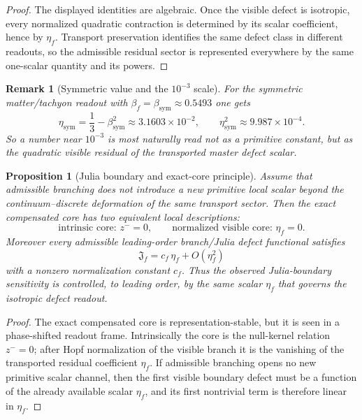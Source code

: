 \documentclass[12pt,a4paper]{article}
\newtheorem{proposition}[theorem]{Proposition}
\newtheorem{remark}[theorem]{Remark}
\newcommand{\zminus}{z^-}
\begin{document}
\begin{proof}
The displayed identities are algebraic. Once the visible defect is isotropic, every normalized quadratic contraction is determined by its scalar coefficient, hence by $\eta_f$. Transport preservation identifies the same defect class in different readouts, so the admissible residual sector is represented everywhere by the same one-scalar quantity and its powers.
\end{proof}

\begin{remark}[Symmetric value and the $10^{-3}$ scale]
For the symmetric matter/tachyon readout with $\beta_f=\beta_{\mathrm{sym}}\approx0.5493$ one gets
\[
 \eta_{\mathrm{sym}}=\frac13-\beta_{\mathrm{sym}}^2\approx 3.1603\times10^{-2},
 \qquad
 \eta_{\mathrm{sym}}^2\approx 9.987\times10^{-4}.
\]
So a number near $10^{-3}$ is most naturally read not as a primitive constant, but as the quadratic visible residual of the transported master defect scalar.
\end{remark}

\begin{proposition}[Julia boundary and exact-core principle]
\label{prop:julia-master-residual}
Assume that admissible branching does not introduce a new primitive local scalar beyond the continuum--discrete deformation of the same transport sector. Then the exact compensated core has two equivalent local descriptions:
\[
 \text{intrinsic core: }\zminus=0,
 \qquad
 \text{normalized visible core: }\eta_f=0.
\]
Moreover every admissible leading-order branch/Julia defect functional satisfies
\[
 \mathfrak J_f=c_f\,\eta_f+O(\eta_f^2)
\]
with a nonzero normalization constant $c_f$. Thus the observed Julia-boundary sensitivity is controlled, to leading order, by the same scalar $\eta_f$ that governs the isotropic defect readout.
\end{proposition}

\begin{proof}
The exact compensated core is representation-stable, but it is seen in a phase-shifted readout frame. Intrinsically the core is the null-kernel relation $\zminus=0$; after Hopf normalization of the visible branch it is the vanishing of the transported residual coefficient $\eta_f$. If admissible branching opens no new primitive scalar channel, then the first visible boundary defect must be a function of the already available scalar $\eta_f$, and its first nontrivial term is therefore linear in $\eta_f$.
\end{proof}
\end{document}
